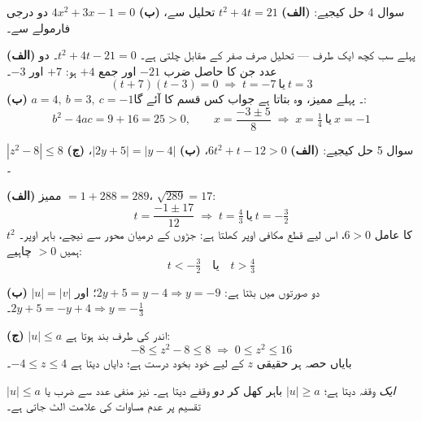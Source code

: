 \begin{sawal}{سوال \textenglish{4}}
حل کیجیے: \textbf{(الف)} \(t^{2}+4t=21\) تحلیل سے، \quad
\textbf{(ب)} \(4x^{2}+3x-1=0\) دو درجی فارمولے سے۔
\end{sawal}

\begin{hal}
\textbf{(الف)} پہلے سب کچھ ایک طرف --- تحلیل صرف صفر کے مقابل چلتی ہے۔
\(t^{2}+4t-21=0\)۔ دو عدد جن کا حاصل ضرب \(-21\) اور جمع \(+4\) ہو: \(+7\) اور
\(-3\)۔
\[
(t+7)(t-3)=0 \;\Longrightarrow\; t=-7 \ \text{یا}\ t=3
\]
\textbf{(ب)} \(a=4,\ b=3,\ c=-1\)۔ پہلے ممیز، وہ بتاتا ہے جواب کس قسم کا آئے گا:
\[
b^{2}-4ac=9+16=25>0,\qquad
x=\frac{-3\pm 5}{8} \;\Longrightarrow\; x=\tfrac14 \ \text{یا}\ x=-1
\]

\end{hal}

\begin{sawal}{سوال \textenglish{5}}
حل کیجیے: \textbf{(الف)} \(6t^{2}+t-12>0\)، \quad
\textbf{(ب)} \(|2y+5|=|y-4|\)، \quad \textbf{(ج)} \(|z^{2}-8|\le 8\)۔
\end{sawal}

\begin{hal}
\textbf{(الف)} ممیز \(=1+288=289\)، \(\sqrt{289}=17\):
\[
t=\frac{-1\pm 17}{12} \;\Longrightarrow\; t=\tfrac43 \ \text{یا}\ t=-\tfrac32
\]
\(t^{2}\) کا عامل \(6>0\)، اس لیے قطع مکافی اوپر کھلتا ہے: جڑوں کے درمیان محور
سے نیچے، باہر اوپر۔ ہمیں \(>0\) چاہیے:
\[
t<-\tfrac32 \quad\text{یا}\quad t>\tfrac43
\]

\textbf{(ب)} \(|u|=|v|\) دو صورتوں میں بٹتا ہے:
\(2y+5=y-4 \Rightarrow y=-9\)؛ اور \(2y+5=-y+4 \Rightarrow y=-\tfrac13\)۔

\textbf{(ج)} \(|u|\le a\) اندر کی طرف بند ہوتا ہے:
\[
-8\le z^{2}-8\le 8 \;\Longrightarrow\; 0\le z^{2}\le 16
\]
بایاں حصہ ہر حقیقی \(z\) کے لیے خود بخود درست ہے؛ دایاں دیتا ہے
\(-4\le z\le 4\)۔

\end{hal}

\begin{ghalti}
\(|u|\le a\) \emph{ایک} وقفہ دیتا ہے؛ \(|u|\ge a\) باہر کھل کر \emph{دو} وقفے
دیتا ہے۔ نیز منفی عدد سے ضرب یا تقسیم پر عدم مساوات کی علامت الٹ جاتی ہے۔
\end{ghalti}

